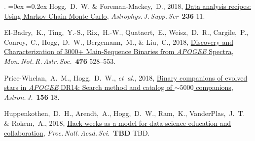 \documentclass[12pt,letterpaper]{article}
\newcommand{\latin}[1]{\textsl{#1}}
\newcommand{\etal}{\latin{et~al.}}
\newcommand{\project}[1]{\textsl{#1}}
\newcommand{\doi}[2]{\href{http://dx.doi.org/#1}{{#2}}}
\newcommand{\deemph}[1]{\textcolor{grey}{\footnotesize{#1}}}
\newcommand{\pubnumber}[1]{\deemph{{#1}.}}
\newcommand{\hoggheading}[1]{\addvspace{1ex}\pagebreak[3]%
    \par\textbf{#1}\nopagebreak%
    \afterpage{\markboth{David W. Hogg, curriculum vitae continued: \textbf{#1}}{}}%
    \nopagebreak\\*[0.5ex]\nopagebreak}%
\newcounter{refpubnum}
\newcommand{\hogglist}{%
    \rightmargin=0in
    \leftmargin=0.18in
    \topsep=0ex
    \partopsep=0pt
    \itemsep=0.2ex
    \parsep=0pt
    \itemindent=-1.0\leftmargin
    \listparindent=0.0\leftmargin
    \settowidth{\labelsep}{~}
    \usecounter{refpubnum}
  }
\begin{document}
\begin{list}{\pubnumber{\therefpubnum}}{\hogglist}
Hogg,~D.~W. \& Foreman-Mackey,~D., 2018,
\doi{10.3847/1538-4365/aab76e}{Data analysis recipes: Using Markov Chain Monte Carlo},
\textit{Astrophys.\,J.\,Supp.\,Ser}\ \textbf{236} 11.
\item
El-Badry,~K., Ting,~Y.-S., Rix,~H.-W., Quataert,~E., Weisz,~D.~R., Cargile,~P., Conroy,~C., Hogg,~D.~W., Bergemann,~M., \& Liu,~C., 2018,
\doi{10.1093/mnras/sty240}{Discovery and Characterization of 3000+ Main-Sequence Binaries from \project{APOGEE} Spectra},
\textit{Mon.\,Not.\,R.\,Astr.\,Soc.}\ \textbf{476} 528--553.
\item
Price-Whelan,~A.~M., Hogg,~D.~W., \etal, 2018,
\doi{10.3847/1538-3881/aac387}{Binary companions of evolved stars in \project{APOGEE} DR14: Search method and catalog of $\sim5000$ companions},
\textit{Astron.\,J.}\ \textbf{156} 18.
\item
Huppenkothen,~D.~H., Arendt,~A., Hogg,~D.~W., Ram,~K., VanderPlas,~J.~T. \& Rokem,~A., 2018,
\doi{10.1073/pnas.1717196115}{Hack weeks as a model for data science education and collaboration},
\textit{Proc.\,Natl.\,Acad.\,Sci.}\ \textbf{TBD} TBD.
\label{rpcount}\end{list}

\end{document}
